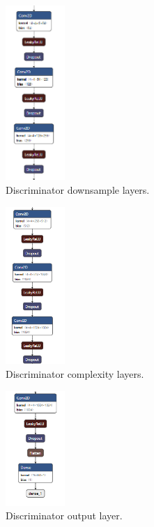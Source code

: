 \documentclass[12pt,a4paper,oneside]{memoir}
\begin{document}
    \begin{figure}[H]
    \centering
    \includegraphics[width=0.2\textwidth]{images/discriminator_2.png}
    \caption{Discriminator downsample layers.}
    \centering
    \label{fig:disc}
    \end{figure}
    
    
    
        
    \begin{figure}[H]
    \centering
    \includegraphics[width=0.2\textwidth]{images/discriminator_3.png}
    \caption{Discriminator complexity layers.}
    \centering
    \label{fig:disc}
    \end{figure}
    
    
    
        
    \begin{figure}[H]
    \centering
    \includegraphics[width=0.2\textwidth]{images/discriminator_4.png}
    \caption{Discriminator output layer.}
    \centering
    \label{fig:disc}
    \end{figure}
    
\end{document}

